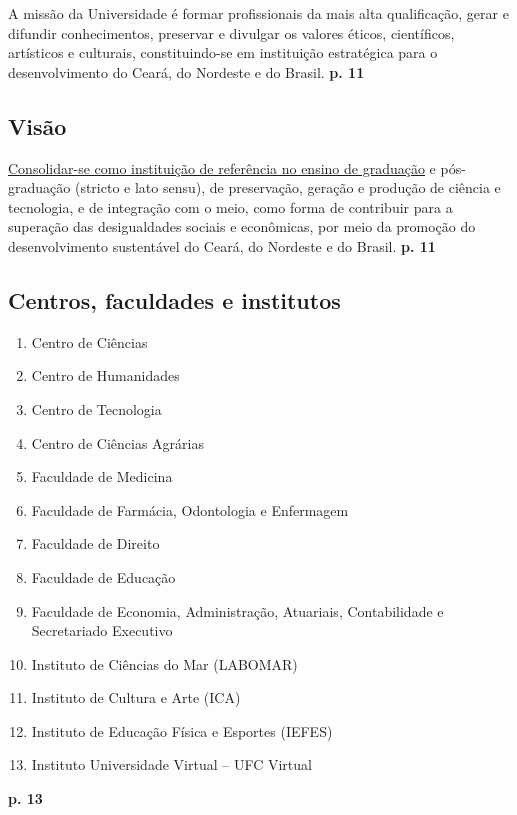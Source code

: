 \documentclass{report}
\begin{document}
A missão da Universidade é formar profissionais da mais alta qualificação, gerar e difundir conhecimentos, preservar e divulgar os valores éticos, científicos, artísticos e culturais, constituindo-se em instituição estratégica para o desenvolvimento do Ceará, do Nordeste e do Brasil.
\textbf{p. 11}

\subsection{Visão}

\underline{Consolidar-se como instituição de referência no ensino de graduação} e pós-graduação (stricto e lato sensu), de preservação, geração e produção de ciência e tecnologia, e de integração com o meio, como forma de contribuir para a superação das desigualdades sociais e econômicas, por meio da promoção do desenvolvimento sustentável do Ceará, do Nordeste e do Brasil.
\textbf{p. 11}

\subsection{Centros, faculdades e institutos}

\begin{enumerate}
\item 
Centro de Ciências
\item 
Centro de Humanidades
\item 
Centro de Tecnologia
\item 
Centro de Ciências Agrárias
\item 
Faculdade de Medicina
\item 
Faculdade de Farmácia, Odontologia e Enfermagem
\item 
Faculdade de Direito
\item 
Faculdade de Educação
\item 
Faculdade de Economia, Administração, Atuariais, Contabilidade e Secretariado Executivo
\item 
Instituto de Ciências do Mar (LABOMAR)
\item 
Instituto de Cultura e Arte (ICA)
\item 
Instituto de Educação Física e Esportes (IEFES)
\item 
Instituto Universidade Virtual – UFC Virtual
\end{enumerate}
\textbf{p. 13}
\end{document}
